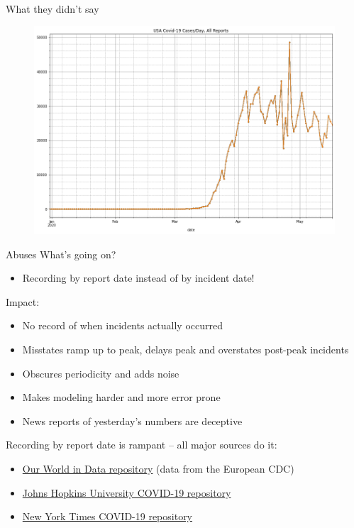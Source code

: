 \documentclass[aspectratio=169]{beamer}
\begin{document}
\begin{frame}{What they didn't say}
  \begin{figure}
    \centering
    \includegraphics[height=.8\textheight]{../Notebooks/USACasesPerDayRawNoLegend.png}
  \end{figure}
\end{frame}


\begin{frame}{Abuses}
  What's going on?
  \begin{itemize}
  \item Recording by report date instead of by incident date!
  \end{itemize}
  
  Impact:
  \begin{itemize}
  \item No record of when incidents actually occurred
  \item Misstates ramp up to peak, delays peak and overstates
    post-peak incidents
  \item Obscures periodicity and adds noise
  \item Makes modeling harder and more error prone
  \item News reports of yesterday's numbers are deceptive
  \end{itemize}

  Recording by report date is rampant -- all major sources do it:
  \begin{itemize}
  \item \href{https://github.com/owid/covid-19-data}{Our World in Data
    repository} (data from the European CDC)
  \item \href{https://github.com/CSSEGISandData/COVID-19}{Johns Hopkins
    University COVID-19 repository}
  \item \href{https://github.com/nytimes/covid-19-data}{New York Times
    COVID-19 repository}
  \end{itemize}
\end{frame}
\end{document}
